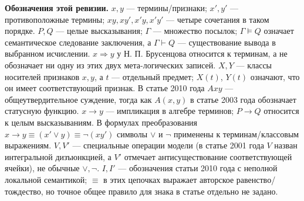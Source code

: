 \documentclass[12pt,a4paper]{article}
\begin{document}
\textbf{Обозначения этой ревизии.} \(x,y\) — термины/признаки; \(x',y'\) — противоположные термины; \(xy,xy',x'y,x'y'\) — четыре сочетания в таком порядке. \(P,Q\) — целые высказывания; \(\Gamma\) — множество посылок; \(\Gamma\models Q\) означает семантическое следование заключения, а \(\Gamma\vdash Q\) — существование вывода в выбранном исчислении. \(x\Rightarrow y\) у Н. П. Брусенцова относится к терминам, а не обозначает ни одну из этих двух мета-логических записей. \(X,Y\) — классы носителей признаков \(x,y\), а \(t\) — отдельный предмет; \(X(t)\), \(Y(t)\) означают, что он имеет соответствующий признак. В статье 2010 года \(Axy\) — общеутвердительное суждение, тогда как \(A(x,y)\) в статье 2003 года обозначает статусную функцию. \(x\to y\) — импликация в алгебре терминов; \(P\to Q\) относится к целым высказываниям. В формулах преобразования \(x\to y\equiv(x'\lor y)\equiv\neg(xy')\) символы \(\lor\) и \(\neg\) применены к терминам/классовым выражениям. \(V,V'\) — специальные операции модели (в статье 2001 года \(V\) назван интегральной дизъюнкцией, а \(V'\) отмечает антисуществование соответствующей ячейки), не обычные \(\lor,\neg\). \(I,I'\) — обозначения статьи 2010 года с неполной локальной семантикой; \(\equiv\) в этих цепочках выражает авторское равенство/тождество, но точное общее правило для знака в статье отдельно не задано.
\end{document}
